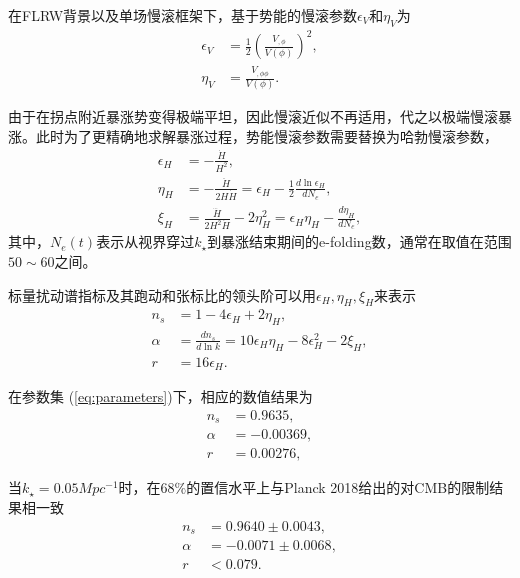 在FLRW背景以及单场慢滚框架下，基于势能的慢滚参数$\epsilon_V$和$\eta_V$为
\begin{align}
  \epsilon_V &= \frac{1}{2}{\left(\frac{V_{,\phi}}{V(\phi)}\right)}^2, \\
  \eta_V &= \frac{V_{,\phi \phi}}{V(\phi)}.
\end{align}

由于在拐点附近暴涨势变得极端平坦，因此慢滚近似不再适用\citep{dimopoulos2017ultra,germani2017primordial}，代之以极端慢滚暴涨。此时为了更精确地求解暴涨过程，势能慢滚参数需要替换为哈勃慢滚参数\citep{schwarz2001higher,leach2002cosmological,schwarz2004primordial}，
\begin{align}
    \epsilon_H &= -\frac{\dot{H}}{H^2}, \\
    \eta_H &= -\frac{\ddot{H}}{2H\dot{H}}=\epsilon_H-\frac{1}{2}\frac{d \ln\epsilon_H}{dN_e}, \\
    \xi_H &=
    \frac{\dddot{H}}{2H^2\dot{H}}-2\eta^2_H=\epsilon_H\eta_H-\frac{d\eta_H}{dN_e},
\end{align}
其中，$N_e(t)$表示从视界穿过$k_{\star}$到暴涨结束期间的e-folding数，通常在取值在范围$50\sim60$之间。

标量扰动谱指标及其跑动和张标比的领头阶可以用$\epsilon_H,\eta_H,\xi_H$来表示
\begin{align}
    n_s &= 1- 4\epsilon_H+2\eta_H, \\
    \alpha &= \frac{dn_s}{d\ln k}=10\epsilon_H\eta_H-8\epsilon_H^2-2\xi_H, \\
    r &= 16\epsilon_H.
\end{align}

在参数集 (\ref{eq:parameters})下，相应的数值结果为
\begin{align}
  n_s &= 0.9635,\\
  \alpha&=-0.00369,\\
  r&=0.00276,
\end{align}

当$k_{\star}=0.05Mpc^{-1}$时，在$68\%$的置信水平上与Planck
2018给出的对CMB的限制结果相一致\citep{akrami2018planck}
\begin{align}
  n_s &= 0.9640\pm 0.0043,\\
  \alpha &= -0.0071\pm 0.0068,\\
  r &< 0.079.
\end{align}

